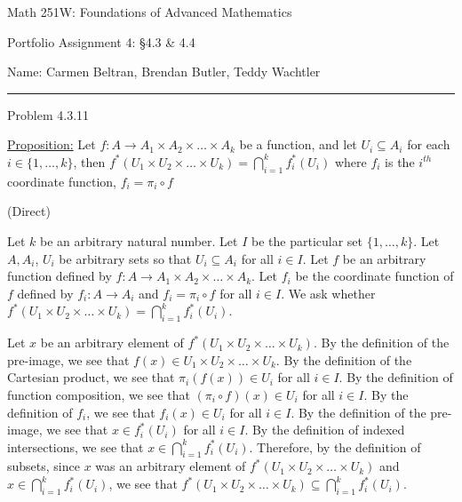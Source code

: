 \documentclass{article}
\theoremstyle{definition}
\newcommand{\pimg}{^{*}}
\begin{document}
	\begin{center}
		\Large{Math 251W: Foundations of Advanced Mathematics}
		\vspace{0.1cm}

		\normalsize Portfolio Assignment 4: \S 4.3 \& 4.4
		\vspace{0.1cm}

		\hfill Name: Carmen Beltran, Brendan Butler, Teddy Wachtler
		\vspace{0.1cm}

		\hrule
		\vspace{0.5cm}
	\end{center}


	\noindent Problem 4.3.11
	\vspace{0.2cm}

	\underline{Proposition:}
	Let $f : A \rightarrow A_1 \times A_2 \times \dots \times A_k$ be a function, and let $U_i \subseteq A_i$ for each $i \in\{1, \ldots, k\}$, then $f \pimg (U_1 \times U_2 \times \dots \times U_k) = \bigcap_{i = 1}^k f_i \pimg (U_i)$ where $f_i$ is the $i^{th}$ coordinate function, $f_i = \pi_i \circ f$

	\vspace{0.2cm}
	 (Direct)
	\vspace{0.2cm}

	Let $k$ be an arbitrary natural number.
	Let $I$ be the particular set $\{1, \dots, k\}$.
	Let $A, A_i$, $U_i$ be arbitrary sets so that $U_i \subseteq A_i$ for all $i \in I$.
	Let $f$ be an arbitrary function defined by $f : A \rightarrow A_1 \times A_2 \times \dots \times A_k$.
	Let $f_i$ be the coordinate function of $f$ defined by $f_i : A \rightarrow A_i$ and $f_i = \pi_i \circ f$ for all $i \in I$.
	We ask whether $f \pimg (U_1 \times U_2 \times \dots \times U_k) = \bigcap_{i = 1}^k f_i \pimg (U_i)$.

	Let $x$ be an arbitrary element of $f \pimg (U_1 \times U_2 \times \dots \times U_k)$.
	By the definition of the pre-image, we see that $f(x) \in U_1 \times U_2 \times \dots \times U_k$.
	By the definition of the Cartesian product, we see that $\pi_i(f(x)) \in U_i$ for all $i \in I$.
	By the definition of function composition, we see that $(\pi_i \circ f)(x) \in U_i$ for all $i \in I$.
	By the definition of $f_i$, we see that $f_i(x) \in U_i$ for all $i \in I$.
	By the definition of the pre-image, we see that $x \in f_i \pimg (U_i)$ for all $i \in I$.
	By the definition of indexed intersections, we see that $x \in \bigcap_{i = 1}^k f_i \pimg (U_i)$.
	Therefore, by the definition of subsets, since $x$ was an arbitrary element of $f \pimg (U_1 \times U_2 \times \dots \times U_k)$ and $x \in \bigcap_{i = 1}^k f_i \pimg (U_i)$, we see that $f \pimg (U_1 \times U_2 \times \dots \times U_k) \subseteq \bigcap_{i = 1}^k f_i \pimg (U_i)$.
\end{document}
